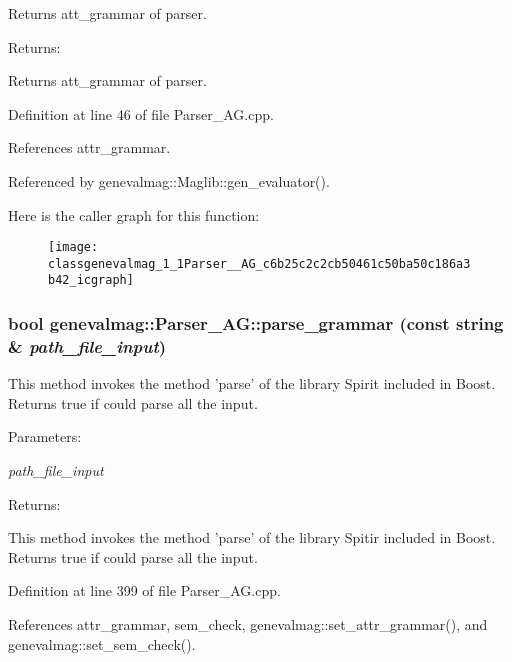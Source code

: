 Returns att\_\-grammar of parser. \begin{Desc}
\item[Returns:]\end{Desc}
Returns att\_\-grammar of parser. 

Definition at line 46 of file Parser\_\-AG.cpp.

References attr\_\-grammar.

Referenced by genevalmag::Maglib::gen\_\-evaluator().

Here is the caller graph for this function:\nopagebreak
\begin{figure}[H]
\begin{center}
\leavevmode
\texttt{[image: classgenevalmag\_1\_1Parser\_\_AG\_c6b25c2c2cb50461c50ba50c186a3b42\_icgraph]}
\end{center}
\end{figure}
\hypertarget{classgenevalmag_1_1Parser__AG_2eda33cb61d0bb2430557ebcad714a10}{
\subsubsection[{parse\_\-grammar}]{\setlength{\rightskip}{0pt plus 5cm}bool genevalmag::Parser\_\-AG::parse\_\-grammar (const string \& {\em path\_\-file\_\-input})}}
\label{classgenevalmag_1_1Parser__AG_2eda33cb61d0bb2430557ebcad714a10}


This method invokes the method 'parse' of the library Spirit included in Boost. Returns true if could parse all the input. \begin{Desc}
\item[Parameters:]
\begin{description}
\item[{\em path\_\-file\_\-input}]\end{description}
\end{Desc}
\begin{Desc}
\item[Returns:]\end{Desc}
This method invokes the method 'parse' of the library Spitir included in Boost. Returns true if could parse all the input. 

Definition at line 399 of file Parser\_\-AG.cpp.

References attr\_\-grammar, sem\_\-check, genevalmag::set\_\-attr\_\-grammar(), and genevalmag::set\_\-sem\_\-check().

